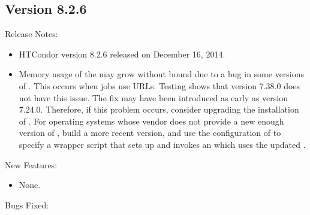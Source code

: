 \subsection*{\label{sec:New-8-2-6}Version 8.2.6}

\noindent Release Notes:

\begin{itemize}

\item HTCondor version 8.2.6 released on December 16, 2014.

\item Memory usage of the 
may grow without bound due to a bug in some versions of .
This occurs when jobs use  URLs.  
Testing shows that  version 7.38.0 does not have this issue.
The fix may have been introduced as early as version 7.24.0.
Therefore,
if this problem occurs, 
consider upgrading the installation of .
For operating systems whose vendor
does not provide a new enough version of , 
build a more recent version, 
and use the configuration of  to specify
a wrapper script that sets up and invokes an  which
uses the updated .

\end{itemize}


\noindent New Features:

\begin{itemize}

\item None.

\end{itemize}

\noindent Bugs Fixed:

